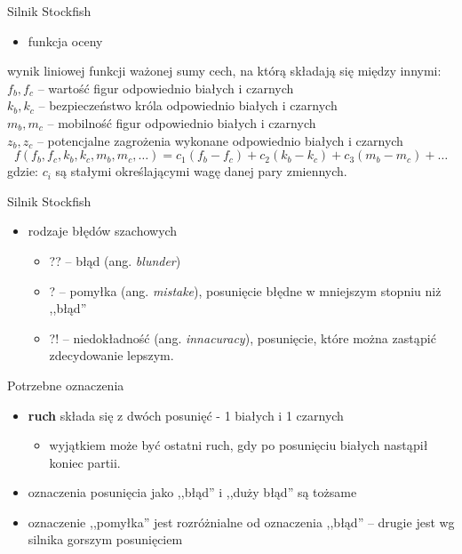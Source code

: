 \documentclass{beamer}
\begin{document}
\begin{frame}{Silnik Stockfish}
	\begin{itemize}
		\item funkcja oceny
	\end{itemize}
	wynik liniowej funkcji 
	ważonej sumy cech, na którą składają się między innymi:\\
	$f_b,f_c$ -- wartość figur odpowiednio białych i czarnych\\
	$k_b,k_c$ -- bezpieczeństwo króla odpowiednio białych i czarnych\\
	$m_b,m_c$ -- mobilność figur odpowiednio białych i czarnych\\
	$z_b,z_c$ -- potencjalne zagrożenia wykonane odpowiednio białych i czarnych\\
	\begin{equation*}
		f(f_b,f_c,k_b,k_c,m_b,m_c,\dots)=c_1(f_b-f_c)+c_2(k_b-k_c)+c_3(m_b-m_c)+\dots
	\end{equation*}
	gdzie:
	$c_i$ są stałymi określającymi wagę danej pary zmiennych.
\end{frame}

\begin{frame}{Silnik Stockfish}
	\begin{itemize}
		\item rodzaje błędów szachowych
		\begin{itemize}
			\item ??\hphantom{!} -- błąd (ang. \textit{blunder})
			\item ?\hphantom{?!}  -- pomyłka (ang. \textit{mistake}), posunięcie błędne w mniejszym stopniu niż ,,błąd''
			\item ?!\hphantom{?} -- niedokładność  (ang. \textit{innacuracy}), posunięcie, które można zastąpić zdecydowanie lepszym.
		\end{itemize}
	\end{itemize}
\end{frame}

\begin{frame}{Potrzebne oznaczenia}
	\begin{itemize}
		\item \textbf{ruch} składa się z dwóch posunięć - 1 białych i 1 czarnych
		\begin{itemize}
			\item wyjątkiem może być ostatni ruch, gdy po posunięciu białych nastąpił koniec partii.
		\end{itemize}
		\item oznaczenia posunięcia jako ,,błąd'' i ,,duży błąd'' są tożsame
		\item oznaczenie ,,pomyłka'' jest rozróżnialne od oznaczenia ,,błąd'' -- drugie jest wg silnika gorszym posunięciem
	\end{itemize}
\end{frame}
\end{document}
